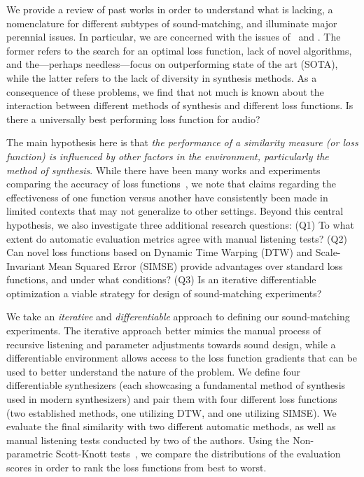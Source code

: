 We provide a review of past works in order to understand what is lacking, a nomenclature for different subtypes of sound-matching, and illuminate major perennial issues. In particular, we are concerned with the issues of \LossSelect~and \SynthSelect. The former refers to the search for an optimal loss function, lack of novel algorithms, and the---perhaps needless---focus on outperforming state of the art (\gls{SOTA}), while the latter refers to the lack of diversity in synthesis methods. As a consequence of these problems, we find that not much is known about the interaction between different methods of synthesis and different loss functions. Is there a universally best performing loss function for audio? 


The main hypothesis here is that \textit{the performance of a similarity measure (or loss function) is influenced by other factors in the environment, particularly the method of synthesis}. While there have been many works and experiments comparing the accuracy of loss functions~\cite{vahidi2023mesostructures,turian2020sorry,engel2020ddsp,uzrad2024diffmoog,han2023perceptual,masuda2021soundmatch,turian2020sorry,bruford2024synthesizer}, we note that claims regarding the effectiveness of one function versus another have consistently been made in limited contexts that may not generalize to other settings. Beyond this central hypothesis, we also investigate three additional research questions: (Q1) To what extent do automatic evaluation metrics agree with manual listening tests? (Q2) Can novel loss functions based on Dynamic Time Warping (DTW) and Scale-Invariant Mean Squared Error (SIMSE) provide advantages over standard loss functions, and under what conditions?
(Q3) Is an iterative differentiable optimization a viable strategy for design of sound-matching experiments?




 We take an \textit{iterative} and \textit{differentiable} approach to defining our sound-matching experiments. The iterative approach better mimics the manual process of recursive listening and parameter adjustments towards sound design, while a differentiable environment allows access to the loss function gradients that can be used to better understand the nature of the problem. We define four differentiable synthesizers (each showcasing a fundamental method of synthesis used in modern synthesizers) and pair them with four different loss functions (two established methods, one utilizing DTW, and one utilizing SIMSE). We evaluate the final similarity with two different automatic methods, as well as manual listening tests conducted by two of the authors. Using the Non-parametric Scott-Knott tests~\cite{tantithamthavorn2017mvt,tantithamthavorn2018optimization}, we compare the distributions of the evaluation scores in order to rank the loss functions from best to worst. 


